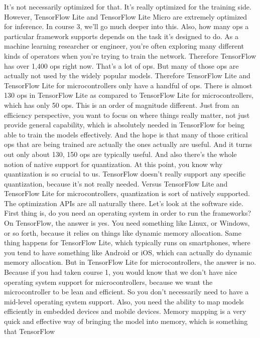 It's not necessarily optimized for that.
It's really optimized for the training side.
However, TensorFlow Lite and TensorFlow Lite Micro
are extremely optimized for inference.
In course 3, we'll go much deeper into this.
Also, how many ops a particular framework supports depends on the task
it's designed to do.
As a machine learning researcher or engineer,
you're often exploring many different kinds of operators when
you're trying to train the network.
Therefore TensorFlow has over 1,400 ops right now.
That's a lot of ops.
But many of those ops are actually not used by the widely popular models.
Therefore TensorFlow Lite and TensorFlow Lite for microcontrollers
only have a handful of ops.
There is almost 130 ops in TensorFlow Lite
as compared to TensorFlow Lite for microcontrollers,
which has only 50 ops.
This is an order of magnitude different.
Just from an efficiency perspective, you want
to focus on where things really matter, not just
provide general capability, which is absolutely
needed in TensorFlow for being able to train the models effectively.
And the hope is that many of those critical ops that are being trained
are actually the ones actually are useful.
And it turns out only about 130, 150 ops are typically useful.
And also there's the whole notion of native support for quantization.
At this point, you know why quantization is so crucial to us.
TensorFlow doesn't really support any specific quantization,
because it's not really needed.
Versus TensorFlow Lite and TensorFlow Lite for microcontrollers, quantization
is sort of natively supported.
The optimization APIs are all naturally there.
Let's look at the software side.
First thing is, do you need an operating system in order to run the frameworks?
On TensorFlow, the answer is yes.
You need something like Linux, or Windows, or so forth,
because it relies on things like dynamic memory allocation.
Same thing happens for TensorFlow Lite, which
typically runs on smartphones, where you tend
to have something like Android or iOS, which can actually do dynamic memory
allocation.
But in TensorFlow Lite for microcontrollers, the answer is no.
Because if you had taken course 1, you would
know that we don't have nice operating system support for microcontrollers,
because we want the microcontroller to be lean and efficient.
So you don't necessarily need to have a mid-level operating system support.
Also, you need the ability to map models efficiently
in embedded devices and mobile devices.
Memory mapping is a very quick and effective way
of bringing the model into memory, which is something that TensorFlow
